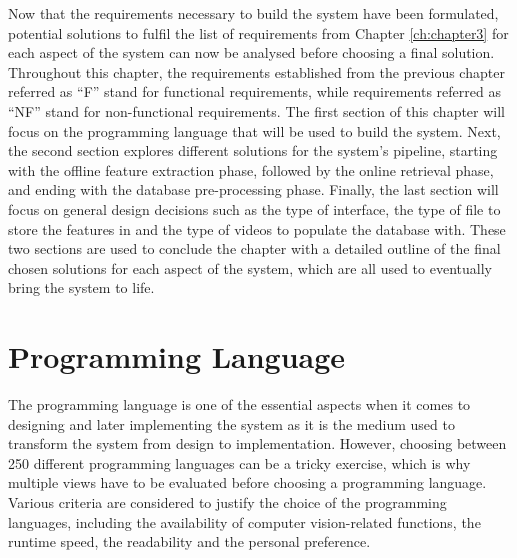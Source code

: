 Now that the requirements necessary to build the system have been formulated, potential solutions to fulfil the list of requirements from Chapter \ref{ch:chapter3} for each aspect of the system can now be analysed before choosing a final solution. Throughout this chapter, the requirements established from the previous chapter referred as ``F'' stand for functional requirements, while requirements referred as ``NF'' stand for non-functional requirements. The first section of this chapter will focus on the programming language that will be used to build the system. Next, the second section explores different solutions for the system's pipeline, starting with the offline feature extraction phase, followed by the online retrieval phase, and ending with the database pre-processing phase. Finally, the last section will focus on general design decisions such as the type of interface, the type of file to store the features in and the type of videos to populate the database with. These two sections are used to conclude the chapter with a detailed outline of the final chosen solutions for each aspect of the system, which are all used to eventually bring the system to life.


\section{Programming Language}
\label{sec:design-programming-languages}

The programming language is one of the essential aspects when it comes to designing and later implementing the system as it is the medium used to transform the system from design to implementation. However, choosing between 250 different programming languages \cite{tiobe} can be a tricky exercise, which is why multiple views have to be evaluated before choosing a programming language. Various criteria are considered to justify the choice of the programming languages, including the availability of computer vision-related functions, the runtime speed, the readability and the personal preference.\\

